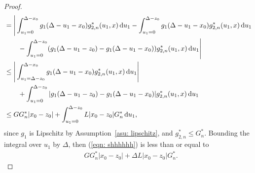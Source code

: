 \begin{proof}
\begin{align}
		\nonumber &{} = \Bigg|\int_{u_1=0}^{\Delta-x_0}g_1(\Delta - u_1 - x_0)g^*_{2,n}(u_1,x)\, \mathrm{d} u_1 - \int_{u_1=0}^{\Delta-z_0}g_1(\Delta - u_1 - x_0)g^*_{2,n}(u_1,x)\, \mathrm{d} u_1
		\\\nonumber &\qquad{} - \int_{u_1=0}^{\Delta-z_0}(g_1(\Delta - u_1 - z_0)-g_1(\Delta - u_1 - x_0))g^*_{2,n}(u_1,x)\, \mathrm{d} u_1\Bigg|
		\\\nonumber& \leq  \Bigg|\int_{u_1=\Delta-z_0}^{\Delta-x_0}g_1(\Delta - u_1 - x_0)g^*_{2,n}(u_1,x)\, \mathrm{d} u_1\Bigg|
		\\\nonumber &\qquad{} + \int_{u_1=0}^{\Delta-z_0}|g_1(\Delta - u_1 - z_0)-g_1(\Delta - u_1 - x_0)|g^*_{2,n}(u_1,x)\, \mathrm{d} u_1
		\\\label{eqn: shhhhhh}& \leq  GG^*_n|x_0-z_0|
		 + \int_{u_1=0}^{\Delta-z_0}L|x_0-z_0|G^*_n\, \mathrm{d} u_1,
	\end{align}
	{since \(g_1\) is Lipschitz by Assumption~\ref{asu: lipschitz}, and \(g_{2,n}^*\leq G_n^*\). Bounding the integral over \(u_1\) by \(\Delta\), then (\ref{eqn: shhhhhh}) is less than or equal to}
	\begin{align}
		&GG^*_n|x_0-z_0| + \Delta L|x_0-z_0|G^*_n.
	\end{align}
\end{proof}

